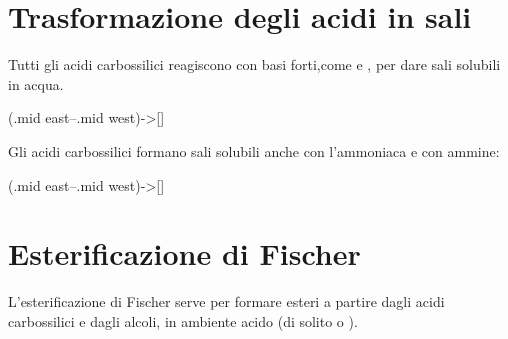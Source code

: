 \section{Trasformazione degli acidi in sali}
Tutti gli acidi carbossilici reagiscono con basi forti,come  e , per dare sali solubili in acqua.

\begingroup
\chemnameinit{}
\begin{reaction}
	\+
	\arrow(.mid east--.mid west){->[]}
	\+ 
\end{reaction}
\chemnameinit{}
\endgroup

Gli acidi carbossilici formano sali solubili anche con l'ammoniaca e con ammine:
\begingroup
\chemnameinit{}
\begin{reaction}
	\+
	\arrow(.mid east--.mid west){->[]}
	\+ 
\end{reaction}
\chemnameinit{}
\endgroup






\section{Esterificazione di Fischer}
L'esterificazione di Fischer serve per formare esteri a partire dagli acidi carbossilici e dagli alcoli, in ambiente acido (di solito  o ).
\begin{reaction}
	\+
	\arrow{->[\ch{H2SO4}]}
	\+ 
\end{reaction}

